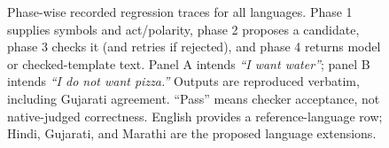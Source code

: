 \begin{figure}[t]
\centering

\caption{Phase-wise recorded regression traces for all languages. Phase 1 supplies symbols and act/polarity, phase 2 proposes a candidate, phase 3 checks it (and retries if rejected), and phase 4 returns model or checked-template text. Panel A intends \emph{“I want water”}; panel B intends \emph{“I do not want pizza.”} Outputs are reproduced verbatim, including Gujarati agreement. “Pass” means checker acceptance, not native-judged correctness. English provides a reference-language row; Hindi, Gujarati, and Marathi are the proposed language extensions.}
\label{fig:workflow}
\end{figure}
